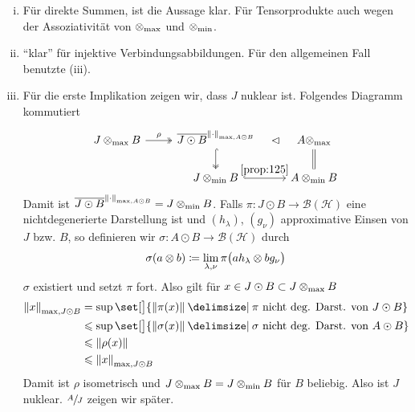\begin{beweis}[{name={mit \autoref{prop:24}}}]
	\leavevmode
	\begin{enumerate}[(i)]
		\item Für direkte Summen, ist die Aussage klar.
		Für Tensorprodukte auch wegen der Assoziativität von $\tensormax$ und $\tensormin$.
		\item \enquote{klar} für injektive Verbindungsabbildungen. 
		Für den allgemeinen Fall benutzte (iii).
		\item Für die erste Implikation zeigen wir, dass $J$ nuklear ist.
		Folgendes Diagramm kommutiert
		\[
			\begin{tikzcd}
				J \tensormax  B \rar["\rho",two heads] & \overline{J \odot B}^{\norm*{\cdot}_{\max, A \odot B}} \dar[hook,two heads] \rar[phantom,sloped,"\lhd"] & A \tensormax \dar[equals] \\
				& J \tensormin B \rar[hook,"\ref{prop:125}"] & A \tensormin B
			\end{tikzcd}
		\]
		Damit ist $\overline{J \odot B}^{\norm*{\cdot}_{\max,A \odot B}} = J \tensormin B$.  
		Falls $\pi \colon J \odot B \to \mathcal{B}(\mathcal{H})$ eine nichtdegenerierte Darstellung ist und $(h_\lambda)$, $(g_\nu)$ approximative Einsen von $J$ bzw. $B$, so definieren wir $\sigma \colon A \odot B \to \mathcal{B}(\mathcal{H})$ durch
		\[
			\sigma(a \otimes b) \coloneqq \lim_{\lambda,\nu} \pi \enbrace[\big]{a h_\lambda \otimes b g_\nu}
		\]
		$\sigma$ existiert und setzt $\pi$ fort.
		Also gilt für $x \in J \odot B \subset J \tensormax B$
		\begin{align}
			\norm*{x}_{\max, J \odot B} &= \sup \set[\big]{\norm*{\pi(x)} \given \pi \text{ nicht deg. Darst. von } J \odot B} \\
			&\le \sup \set[\big]{\norm*{\sigma(x)} \given \sigma \text{ nicht deg. Darst. von } A \odot B} \\
			&\le \norm*{\rho(x)} \\
			&\le \norm*{x}_{\max, J \odot B} 
		\end{align} 
		Damit ist $\rho$ isometrisch und $J \tensormax B = J \tensormin B$ für $B$ beliebig.
		Also ist $J$ nuklear.
		$\sfrac{A}{J}$ zeigen wir später.
		

\end{enumerate}
\end{beweis}
